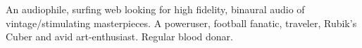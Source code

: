 

\begin{cvparagraph}

  An audiophile, surfing web looking for high fidelity, binaural audio of vintage/stimulating masterpieces.
  A poweruser, football fanatic, traveler, Rubik's Cuber and avid art-enthusiast.
  Regular blood donar.
\end{cvparagraph}  
